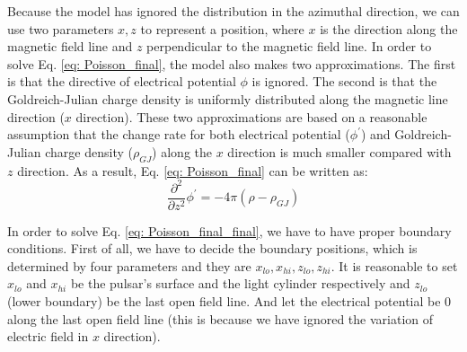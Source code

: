 \documentclass[12pt]{report}
\newcommand{\gj}[0]{
  Goldreich-Julian charge density
}
\begin{document}
      Because the model has ignored the distribution in the azimuthal direction, we can use two parameters 
      $x, z$ to represent a position, where $x$ is the direction along the magnetic field line and $z$  
      perpendicular to the magnetic field line. In order to solve Eq. \ref{eq: Poisson_final}, 
      the model also makes two approximations. The first is that the directive of electrical potential $\phi$ 
      is ignored. The second is that the \gj{} is uniformly distributed along the magnetic line direction 
      ($x$ direction). These two approximations are based on a reasonable assumption that the change rate 
      for both electrical potential ($\phi^{\prime}$) and \gj{}($\rho_{GJ}$) along the $x$ direction is much 
      smaller compared with $z$ direction. 
      As a result, Eq. \ref{eq: Poisson_final} can be written as: 
      \begin{equation}
        \label{eq: Poisson_final_final}
        \frac{\partial^2}{\partial z^2} \phi^{\prime} = -4\pi\left(\rho - \rho_{GJ} \right)
      \end{equation}

      In order to solve Eq. \ref{eq: Poisson_final_final}, we have to have proper boundary conditions. 
      First of all, we have to decide the boundary positions, which is determined by four parameters and they are  
      $x_{lo}, x_{hi}, z_{lo}, z_{hi}$. It is reasonable to set $x_{lo}$ and $x_{hi}$
      be the pulsar's surface and the light cylinder respectively and $z_{lo}$ (lower boundary) be the last open 
      field line. And let the electrical potential be $0$ along the last open field line (this is because we have 
      ignored the variation of electric field in $x$ direction).   
\end{document}
